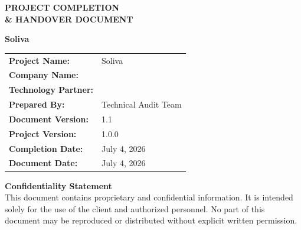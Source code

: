 \documentclass[11pt,a4paper]{article}
\newcommand{\ProjectName}{Soliva}
\newcommand{\CompanyName}{~}                    %
\newcommand{\TechnologyPartner}{~}              %
\newcommand{\PreparedBy}{Technical Audit Team}
\newcommand{\DocumentVersion}{1.1}
\newcommand{\ProjectVersion}{1.0.0}
\newcommand{\CompletionDate}{July 4, 2026}
\newcommand{\DocumentDate}{July 4, 2026}
\begin{document}
\begin{titlepage}
    \centering
    \vspace*{2cm}
    {\Huge\bfseries PROJECT COMPLETION \\[0.4cm] \& HANDOVER DOCUMENT \par}
    \vspace{1.5cm}
    {\huge\bfseries \ProjectName \par}
    \vspace{2cm}

    \begin{tabular}{ll}
        \textbf{Project Name:}       & \ProjectName        \\[4pt]
        \textbf{Company Name:}       & \CompanyName        \\[4pt]
        \textbf{Technology Partner:} & \TechnologyPartner  \\[4pt]
        \textbf{Prepared By:}        & \PreparedBy         \\[4pt]
        \textbf{Document Version:}   & \DocumentVersion    \\[4pt]
        \textbf{Project Version:}    & \ProjectVersion     \\[4pt]
        \textbf{Completion Date:}    & \CompletionDate     \\[4pt]
        \textbf{Document Date:}      & \DocumentDate       \\
    \end{tabular}

    \vfill

    \begin{minipage}{0.85\textwidth}
        \centering
        \textbf{Confidentiality Statement}\\[6pt]
        \small This document contains proprietary and confidential information.
        It is intended solely for the use of the client and authorized personnel.
        No part of this document may be reproduced or distributed without
        explicit written permission.
    \end{minipage}

    \vspace{1.5cm}
\end{titlepage}

{}
\end{document}
